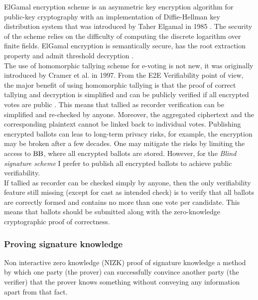 ElGamal encryption scheme  is an asymmetric key encryption algorithm for public-key cryptography with an implementation of Diffie-Hellman key distribution system  that was introduced  by Taher Elgamal in 1985 \cite{Elgamal1985}. The security of the scheme relies on the difficulty of computing the discrete logarithm over finite fields.  ElGamal encryption is semantically secure, has the root extraction property and admit threshold decryption  \cite{Groth2010}. \\

The use of homomorphic tallying scheme for e-voting is not new, it was originally introduced by Cramer et al. \cite{Cramer1997}  in 1997. From the E2E Verifiability point of view, the major benefit of using homomorphic tallying is that the proof of correct tallying and decryption is simplified and can be publicly verified if all encrypted votes are public \cite{Parsovs2016}. This means that tallied as recorder verification can be simplified and re-checked by anyone.  Moreover, the aggregated ciphertext and the corresponding plaintext cannot be linked back to individual votes. Publishing encrypted ballots can leas to long-term privacy risks, for example, the encryption may be broken after a few decades. One may mitigate the risks by limiting the access to $\operatorname{BB}$, where all encrypted ballots are stored. However, for the \textit{Blind signature scheme} I prefer to publish all encrypted ballots to achieve  public verifiability.\\

If tallied as recorder can be checked simply by anyone, then the only  verifiability feature still missing (except for cast as intended check) is to verify that all ballots are correctly formed and contains no more than one vote per candidate. This means that ballots should be submitted along with the zero-knowledge cryptographic proof of correctness. 
\subsubsection{Proving signature knowledge}
Non interactive zero knowledge (NIZK) proof  of signature knowledge a method by which one party (the prover) can successfully convince another party (the verifier) that the prover knows something without conveying any information apart from that fact.\\

